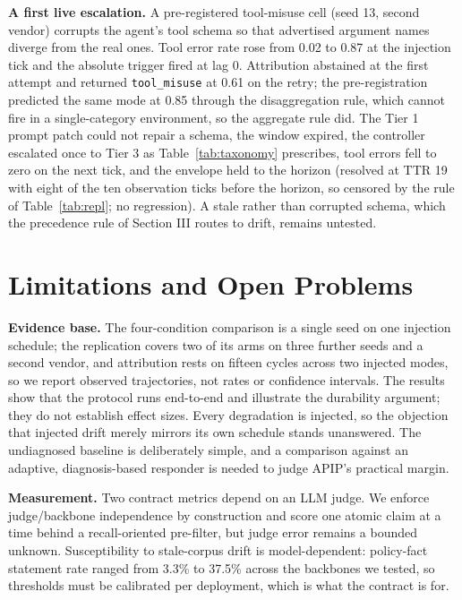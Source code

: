 \documentclass[conference]{IEEEtran}
\begin{document}
\textbf{A first live escalation.} A pre-registered tool-misuse cell (seed 13, second vendor) corrupts the agent's tool schema so that advertised argument names diverge from the real ones. Tool error rate rose from 0.02 to 0.87 at the injection tick and the absolute trigger fired at lag 0. Attribution abstained at the first attempt and returned \texttt{tool\_misuse} at 0.61 on the retry; the pre-registration predicted the same mode at 0.85 through the disaggregation rule, which cannot fire in a single-category environment, so the aggregate rule did. The Tier 1 prompt patch could not repair a schema, the window expired, the controller escalated once to Tier 3 as Table~\ref{tab:taxonomy} prescribes, tool errors fell to zero on the next tick, and the envelope held to the horizon (resolved at TTR 19 with eight of the ten observation ticks before the horizon, so censored by the rule of Table~\ref{tab:repl}; no regression). A stale rather than corrupted schema, which the precedence rule of Section III routes to drift, remains untested.

\section{Limitations and Open Problems}

\textbf{Evidence base.} The four-condition comparison is a single seed on one injection schedule; the replication covers two of its arms on three further seeds and a second vendor, and attribution rests on fifteen cycles across two injected modes, so we report observed trajectories, not rates or confidence intervals. The results show that the protocol runs end-to-end and illustrate the durability argument; they do not establish effect sizes. Every degradation is injected, so the objection that injected drift merely mirrors its own schedule stands unanswered. The undiagnosed baseline is deliberately simple, and a comparison against an adaptive, diagnosis-based responder is needed to judge APIP's practical margin.

\textbf{Measurement.} Two contract metrics depend on an LLM judge. We enforce judge/backbone independence by construction and score one atomic claim at a time behind a recall-oriented pre-filter, but judge error remains a bounded unknown. Susceptibility to stale-corpus drift is model-dependent: policy-fact statement rate ranged from 3.3\% to 37.5\% across the backbones we tested, so thresholds must be calibrated per deployment, which is what the contract is for.
\end{document}
